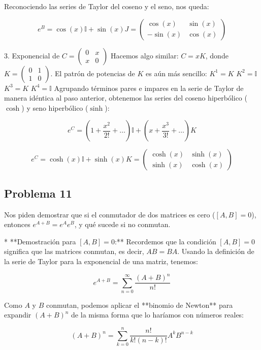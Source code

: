 \documentclass[11pt,spanish]{article}
\begin{document}
Reconociendo las series de Taylor del coseno y el seno, nos queda:


$$e^{B} = \cos(x)\mathbb{I} + \sin(x)J = \begin{pmatrix} \cos(x) & \sin(x) \\ -\sin(x) & \cos(x) \end{pmatrix}$$

3. Exponencial de $C = \begin{pmatrix} 0 & x \\ x & 0 \end{pmatrix}$ 
Hacemos algo similar: $C = x K$, donde $K = \begin{pmatrix} 0 & 1 \\ 1 & 0 \end{pmatrix}$.
El patrón de potencias de $K$ es aún más sencillo:
$K^{1} = K$
$K^{2} = \mathbb{I}$
$K^{3} = K$
$K^{4} = \mathbb{I}$
Agrupando términos pares e impares en la serie de Taylor de manera idéntica al paso anterior, obtenemos las series del coseno hiperbólico ($\cosh$) y seno hiperbólico ($\sinh$):


$$e^{C} = \left( 1 + \frac{x^{2}}{2!} + \dots \right)\mathbb{I} + \left( x + \frac{x^{3}}{3!} + \dots \right)K$$

$$e^{C} = \cosh(x)\mathbb{I} + \sinh(x)K = \begin{pmatrix} \cosh(x) & \sinh(x) \\ \sinh(x) & \cosh(x) \end{pmatrix}$$

\subsection*{Problema 11}

Nos piden demostrar que si el conmutador de dos matrices es cero ($[A,B]=0$), entonces $e^{A+B} = e^{A}e^{B}$, y qué sucede si no conmutan.

* **Demostración para $[A,B]=0$:**
Recordemos que la condición $[A,B]=0$ significa que las matrices conmutan, es decir, $AB = BA$.
Usando la definición de la serie de Taylor para la exponencial de una matriz, tenemos:



$$e^{A+B} = \sum_{n=0}^{\infty} \frac{(A+B)^n}{n!}$$



Como $A$ y $B$ conmutan, podemos aplicar el **binomio de Newton** para expandir $(A+B)^n$ de la misma forma que lo haríamos con números reales:

$$(A+B)^n = \sum_{k=0}^{n} \frac{n!}{k!(n-k)!} A^k B^{n-k}$$
\end{document}
